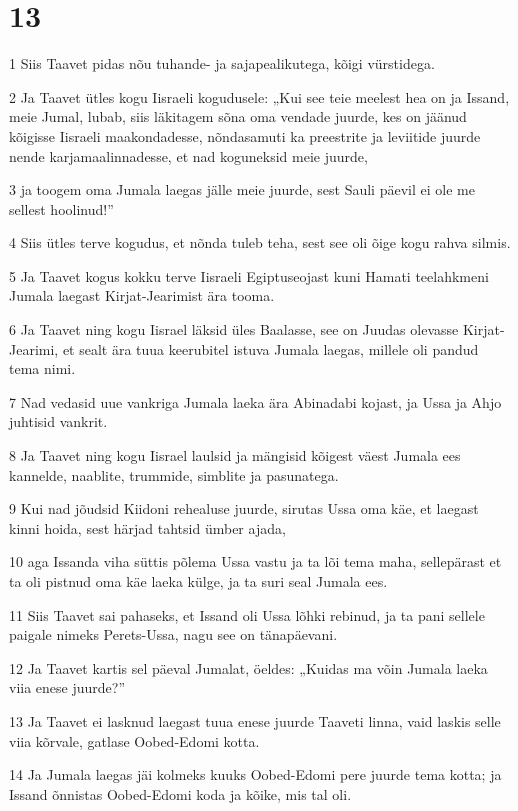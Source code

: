 \chapter{13}

\par 1 Siis Taavet pidas nõu tuhande- ja sajapealikutega, kõigi vürstidega.
\par 2 Ja Taavet ütles kogu Iisraeli kogudusele: „Kui see teie meelest hea on ja Issand, meie Jumal, lubab, siis läkitagem sõna oma vendade juurde, kes on jäänud kõigisse Iisraeli maakondadesse, nõndasamuti ka preestrite ja leviitide juurde nende karjamaalinnadesse, et nad koguneksid meie juurde,
\par 3 ja toogem oma Jumala laegas jälle meie juurde, sest Sauli päevil ei ole me sellest hoolinud!”
\par 4 Siis ütles terve kogudus, et nõnda tuleb teha, sest see oli õige kogu rahva silmis.
\par 5 Ja Taavet kogus kokku terve Iisraeli Egiptuseojast kuni Hamati teelahkmeni Jumala laegast Kirjat-Jearimist ära tooma.
\par 6 Ja Taavet ning kogu Iisrael läksid üles Baalasse, see on Juudas olevasse Kirjat-Jearimi, et sealt ära tuua keerubitel istuva Jumala laegas, millele oli pandud tema nimi.
\par 7 Nad vedasid uue vankriga Jumala laeka ära Abinadabi kojast, ja Ussa ja Ahjo juhtisid vankrit.
\par 8 Ja Taavet ning kogu Iisrael laulsid ja mängisid kõigest väest Jumala ees kannelde, naablite, trummide, simblite ja pasunatega.
\par 9 Kui nad jõudsid Kiidoni rehealuse juurde, sirutas Ussa oma käe, et laegast kinni hoida, sest härjad tahtsid ümber ajada,
\par 10 aga Issanda viha süttis põlema Ussa vastu ja ta lõi tema maha, sellepärast et ta oli pistnud oma käe laeka külge, ja ta suri seal Jumala ees.
\par 11 Siis Taavet sai pahaseks, et Issand oli Ussa lõhki rebinud, ja ta pani sellele paigale nimeks Perets-Ussa, nagu see on tänapäevani.
\par 12 Ja Taavet kartis sel päeval Jumalat, öeldes: „Kuidas ma võin Jumala laeka viia enese juurde?”
\par 13 Ja Taavet ei lasknud laegast tuua enese juurde Taaveti linna, vaid laskis selle viia kõrvale, gatlase Oobed-Edomi kotta.
\par 14 Ja Jumala laegas jäi kolmeks kuuks Oobed-Edomi pere juurde tema kotta; ja Issand õnnistas Oobed-Edomi koda ja kõike, mis tal oli.

